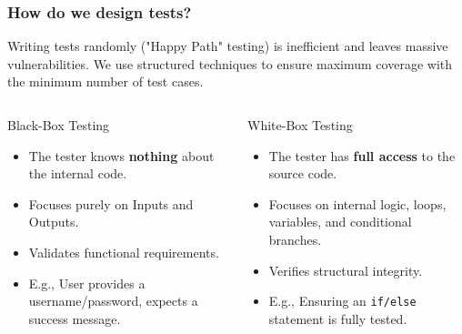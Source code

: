 \documentclass[xcolor=table]{beamer}
\begin{document}
\begin{frame}
    \frametitle{How do we design tests?}
    \small
    Writing tests randomly ("Happy Path" testing) is inefficient and leaves massive vulnerabilities. We use structured techniques to ensure maximum coverage with the minimum number of test cases.
    
    \begin{columns}
        \begin{block}{Black-Box Testing}
            \begin{itemize}
                \item The tester knows \textbf{nothing} about the internal code.
                \item Focuses purely on Inputs and Outputs.
                \item Validates functional requirements.
                \item E.g., User provides a username/password, expects a success message.
            \end{itemize}
        \end{block}
        
        \begin{block}{White-Box Testing}
            \begin{itemize}
                \item The tester has \textbf{full access} to the source code.
                \item Focuses on internal logic, loops, variables, and conditional branches.
                \item Verifies structural integrity.
                \item E.g., Ensuring an \texttt{if/else} statement is fully tested.
            \end{itemize}
        \end{block}
    \end{columns}
\end{frame}
\end{document}
